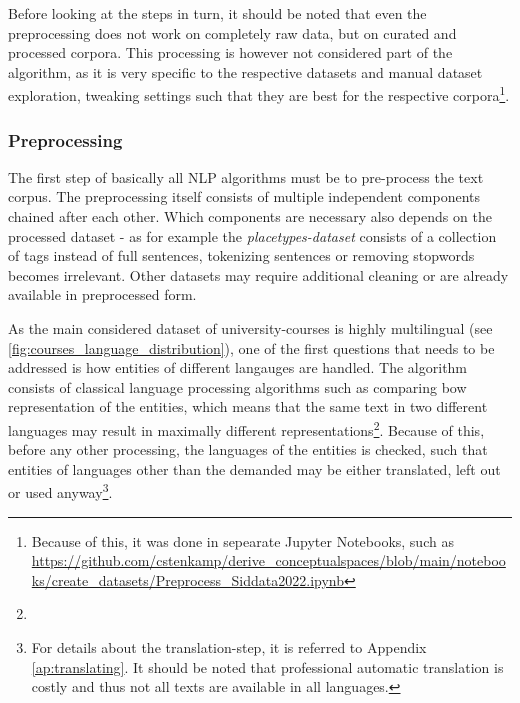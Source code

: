 

Before looking at the steps in turn, it should be noted that even the preprocessing does not work on completely raw data, but on curated and processed corpora. This processing is however not considered part of the algorithm, as it is very specific to the respective datasets and manual dataset exploration, tweaking settings such that they are best for the respective corpora\footnote{Because of this, it was done in sepearate Jupyter Notebooks, such as \url{https://github.com/cstenkamp/derive_conceptualspaces/blob/main/notebooks/create_datasets/Preprocess_Siddata2022.ipynb} }. %


\subsubsection{Preprocessing}

\label{sec:algo_preproc}

The first step of basically all NLP algorithms must be to pre-process the text corpus. The preprocessing itself consists of multiple independent components chained after each other. Which components are necessary also depends on the processed dataset - as for example the \emph{placetypes-dataset} consists of a collection of tags instead of full sentences, tokenizing sentences or removing \glspl{stopword} becomes irrelevant. Other datasets may require additional cleaning or are already available in preprocessed form.

As the main considered dataset of university-courses is highly multilingual (see \autoref{fig:courses_language_distribution}), one of the first questions that needs to be addressed is how entities of different langauges are handled. The algorithm consists of classical language processing algorithms such as comparing \gls{bow} representation of the entities, which means that the same text in two different languages may result in maximally different representations\footnote{}. Because of this, before any other processing, the languages of the entities is checked, such that entities of languages other than the demanded may be either translated, left out or used anyway\footnote{For details about the translation-step, it is referred to Appendix \ref{ap:translating}. It should be noted that professional automatic translation is costly and thus not all texts are available in all languages.}.

